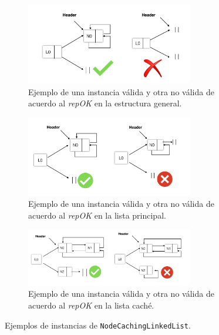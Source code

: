\begin{figure}[p]
    \centering
    \begin{subfigure}[b]{\textwidth}
        \centering
        \includegraphics[width=0.8\textwidth]{images/repOK1.jpg}
        \caption{Ejemplo de una instancia válida y otra no válida de acuerdo al \emph{repOK} en la estructura general.}
        \label{fig:repOKa}
    \end{subfigure}

    \vspace{10pt}

    \begin{subfigure}[b]{\textwidth}
        \centering
        \includegraphics[width=0.8\textwidth]{images/repOK2.jpg}
        \caption{Ejemplo de una instancia válida y otra no válida de acuerdo al \emph{repOK} en la lista principal.}
        \label{fig:repOKb}
    \end{subfigure}

    \vspace{10pt}

    \begin{subfigure}[b]{\textwidth}
        \centering
        \includegraphics[width=0.8\textwidth]{images/repOK3.jpg}
        \caption{Ejemplo de una instancia válida y otra no válida de acuerdo al \emph{repOK} en la lista caché.}
        \label{fig:repOKc}
    \end{subfigure}

    \caption{Ejemplos de instancias de \texttt{NodeCachingLinkedList}.}
    \label{fig:repOK}
\end{figure}



